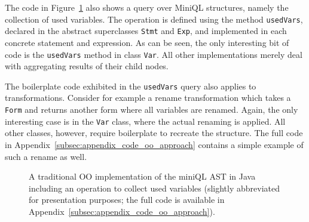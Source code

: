 The code in Figure~\ref{ql_oo_approach} also shows a query over MiniQL structures, namely the collection of used variables.
The operation is defined using the method \lstinline{usedVars}, declared in the abstract superclasses  \lstinline{Stmt} and \lstinline{Exp}, and implemented in each concrete statement and expression.
As can be seen, the only interesting bit of code is the \lstinline{usedVars} method in class \lstinline{Var}.
All other implementations merely deal with aggregating results of their child nodes.

The boilerplate code exhibited in the \lstinline{usedVars} query also applies to transformations.
Consider for example a rename transformation which takes a \lstinline{Form} and returns another form where all variables are renamed.
Again, the only interesting case is in the \lstinline{Var} class, where the actual renaming is applied. All other classes, however, require boilerplate to recreate the structure.
The full code in Appendix~\ref{subsec:appendix_code_oo_approach} contains a simple example of such a rename as well.


\begin{figure}[t]
\nocaptionrule
\caption{A traditional OO implementation of the miniQL AST in Java including an operation to collect used variables (slightly abbreviated for presentation purposes; the full code is available in Appendix~\ref{subsec:appendix_code_oo_approach}).}
\label{ql_oo_approach}
\end{figure}


